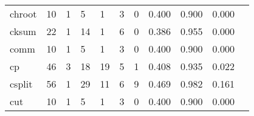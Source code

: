 \begin{longtable}{lp{1.2cm}p{1.2cm}p{1.2cm}p{1.2cm}p{1.2cm}p{1.2cm}p{1.2cm}p{1.2cm}p{1.2cm}p{1.2cm}}
chroot    &                                    10 &                                                  1 &                                                  5 &                                                  1 &                                                  3 &                                                  0 &                                              0.400 &                                              0.900 &                                              0.000 \\
cksum     &                                    22 &                                                  1 &                                                 14 &                                                  1 &                                                  6 &                                                  0 &                                              0.386 &                                              0.955 &                                              0.000 \\
comm      &                                    10 &                                                  1 &                                                  5 &                                                  1 &                                                  3 &                                                  0 &                                              0.400 &                                              0.900 &                                              0.000 \\
cp        &                                    46 &                                                  3 &                                                 18 &                                                 19 &                                                  5 &                                                  1 &                                              0.408 &                                              0.935 &                                              0.022 \\
csplit    &                                    56 &                                                  1 &                                                 29 &                                                 11 &                                                  6 &                                                  9 &                                              0.469 &                                              0.982 &                                              0.161 \\
cut       &                                    10 &                                                  1 &                                                  5 &                                                  1 &                                                  3 &                                                  0 &                                              0.400 &                                              0.900 &                                              0.000 \\

\end{longtable}
